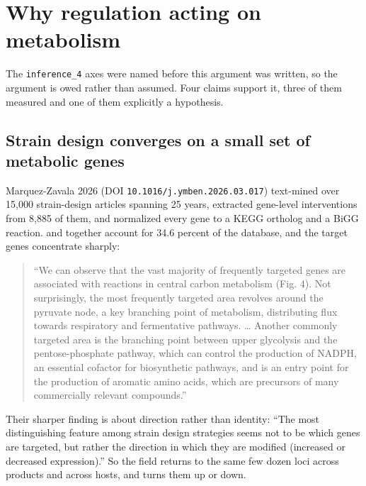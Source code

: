 
\section{Why regulation acting on metabolism}

The \texttt{inference\_4} axes were named before this argument was written, so the
argument is owed rather than assumed. Four claims support it, three of them
measured and one of them explicitly a hypothesis.

\subsection{Strain design converges on a small set of metabolic genes}

Marquez-Zavala 2026 (DOI \texttt{10.1016/j.ymben.2026.03.017}) text-mined over
15{,}000 strain-design articles spanning 25 years, extracted gene-level
interventions from 8{,}885 of them, and normalized every gene to a KEGG ortholog
and a BiGG reaction.  and  together account for
34.6 percent of the database, and the target genes concentrate sharply:

\begin{quote}\footnotesize
``We can observe that the vast majority of frequently targeted genes are
associated with reactions in central carbon metabolism (Fig. 4). Not
surprisingly, the most frequently targeted area revolves around the pyruvate
node, a key branching point of metabolism, distributing flux towards respiratory
and fermentative pathways. \dots{} Another commonly targeted area is the
branching point between upper glycolysis and the pentose-phosphate pathway,
which can control the production of NADPH, an essential cofactor for
biosynthetic pathways, and is an entry point for the production of aromatic
amino acids, which are precursors of many commercially relevant compounds.''
\end{quote}

Their sharper finding is about direction rather than identity: ``The most
distinguishing feature among strain design strategies seems not to be which genes
are targeted, but rather the direction in which they are modified (increased or
decreased expression).'' So the field returns to the same few dozen loci across
products and across hosts, and turns them up or down.

